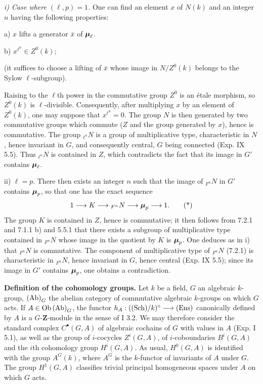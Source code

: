 \par\noindent\emph{i) Case where $(\ell,p)=1$.}
One can find an element $x$ of $N(k)$ and an integer $n$ having the following properties:

\noindent a) $x$ lifts a generator $\bar x$ of $\boldsymbol{\mu}_\ell$.

\noindent b) $x^{\ell^n}\in Z^0(k)$;

(it suffices to choose a lifting of $\bar x$ whose image in $N/Z^0(k)$ belongs to the Sylow $\ell$-subgroup).

Raising to the $\ell$th power in the commutative group $Z^0$ is an étale morphism, so $Z^0(k)$ is $\ell$-divisible. Consequently, after multiplying $x$ by an element of $Z^0(k)$, one may suppose that $x^{\ell^n}=0$. The group $N$ is then generated by two commutative groups which commute ($Z$ and the group generated by $x$), hence is commutative. The group ${}_{\ell^n}N$ is a group of multiplicative type, characteristic in $N$, hence invariant in $G$, and consequently central, $G$ being connected (Exp. IX 5.5). Thus ${}_{\ell^n}N$ is contained in $Z$, which contradicts the fact that its image in $G'$ contains $\boldsymbol{\mu}_\ell$.

\noindent ii) $\ell=p$. There then exists an integer $n$ such that the image of ${}_{F^n}N$ in $G'$ contains $\boldsymbol{\mu}_p$, so that one has the exact sequence
\[
1\longrightarrow K\longrightarrow {}_{F^n}N\longrightarrow\boldsymbol{\mu}_p\longrightarrow1.\tag{*}
\]
The group $K$ is contained in $Z$, hence is commutative; it then follows from 7.2.1 and 7.1.1 b) and 5.5.1 that there exists a subgroup of multiplicative type contained in ${}_{F^n}N$ whose image in the quotient by $K$ is $\boldsymbol{\mu}_p$. One deduces as in i) that ${}_{F^n}N$ is commutative. The component of multiplicative type of ${}_{F^n}N$ (7.2.1) is characteristic in ${}_{F^n}N$, hence invariant in $G$, hence central (Exp. IX 5.5); since its image in $G'$ contains $\boldsymbol{\mu}_p$, one obtains a contradiction.

\label{XVII.A.1}\textbf{Definition of the cohomology groups.}
Let $k$ be a field, $G$ an algebraic $k$-group, $\textup{(Ab)}_G$ the abelian category of commutative algebraic $k$-groups on which $G$ acts. If $A\in\operatorname{Ob}\textup{(Ab)}_G$, the functor $h_A:(\textup{(Sch)}/k)^\circ\longrightarrow\textup{(Ens)}$ canonically defined by $A$ is a $G$-$\mathbf Z$-module in the sense of I 3.2. We may therefore consider the standard complex $C^\bullet(G,A)$ of algebraic cochains of $G$ with values in $A$ (Exp. I 5.1), as well as the group of $i$-cocycles $Z^i(G,A)$, of $i$-coboundaries $B^i(G,A)$ and the $i$th cohomology group $H^i(G,A)$. As usual, $H^0(G,A)$ is identified with the group $A^G(k)$, where $A^G$ is the $k$-functor of invariants of $A$ under $G$. The group $H^1(G,A)$ classifies trivial principal homogeneous spaces under $A$ on which $G$ acts.


